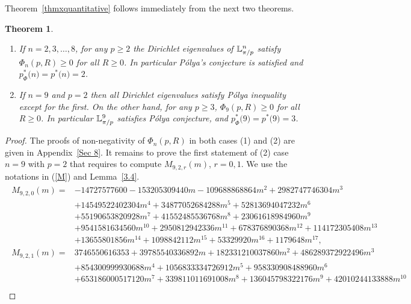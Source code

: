 \documentclass[11pt,a4paper,times]{amsart}
\theoremstyle{plain}
\newtheorem{thm}{Theorem}[section]
\theoremstyle{definition}
\numberwithin{equation}{section}
\newcommand{\pin}[1]{p^*{#1}}
\newcommand{\piphi}[1]{p^*_{\Phi}{#1}}
\newcommand{\luned}[2]{\raisebox{0.5pt}{${}$}\mathbb{L}^{#1}_{\pi/#2}}
\newcommand{\txtg}{\textcolor{green}}
\begin{document}
{ Theorem~\ref{thmxquantitative} follows immediately from the next two theorems.
\begin{thm} \label{thmC}
\begin{enumerate}[{\rm 1)}]
\item If  $n=2,3, \ldots, 8$, for any $p\geq 2$ the Dirichlet eigenvalues of $\luned{n}{p}$
satisfy  $\Phi_n(p,R)\geq 0$ for all $R\geq 0$. In particular  
P\'{o}lya's  conjecture  is satisfied and   $\piphi(n)=\pin(n)=2$.\\[1mm]
\item  If  $n=9$ {and $p=2$} then all Dirichlet  eigenvalues satisfy P\'{o}lya inequality except for the first. On the other hand, for any  $p\geq 3$,
$\Phi_9(p,R)\geq 0$ for all $R\geq 0$. In particular   
$\luned{9}{p}$ satisfies P\'{o}lya conjecture,
and $\piphi(9)=\pin(9)=3$. 
\end{enumerate}
\end{thm}
\begin{proof} The proofs of non-negativity of $\Phi_n(p,R)$ in both cases  (1) and (2) are given in Appendix~\ref{Sec 8}. It remains to prove the first statement of (2) case $n=9$ with $p=2$ that requires to compute $M_{9,2,r}(m)$, $r=0,1$.
We use the notations in (\ref{M}) and Lemma~\ref{3.4}.
\begin{gather*}
\begin{array}{ll}
M_{9,2,0}(m)=\!\!&-14727577600 - 153205309440 m - 109688868864 m^2 +  2982747746304 m^3\\
 & + 14549522402304 m^4 + 34877052684288 m^5 + 52813694047232 m^6\\
 & + 55190653820928 m^7 + 41552485536768 m^8 + 
 23061618984960 m^9\\
 & + 9541581634560 m^{10} + 
 2950812942336 m^{11}
 + 678376890368 m^{12}
 + 114172305408 m^{13}\\
 & + 13655801856 m^{14}
  + 1098842112 m^{15}
 + 53329920 m^{16} + 1179648 m^{17},\\[1mm]
M_{9,2,1}(m)=\!\!&3746550616353 + 39785540336892 m + 182331210037860 m^2 + 486289372922496 m^3\\ 
&+ 854300999930688 m^4 + 1056833334726912 m^5 + 
 958330908488960 m^6\\
 & + 653186000517120 m^7
  + 339811011691008 m^8 + 136045798322176 m^9 + 42010244133888 m^{10}\\

\end{array}
\end{gather*}
\end{proof}}
\end{document}

